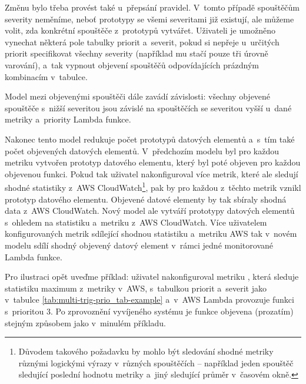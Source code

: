 \documentclass[czech, ing, kiv, he, iso690]{fasthesis}
\begin{document}
Změnu bylo třeba provést také u~přepsání pravidel. V~tomto případě spouštěčům severity neměníme, neboť prototypy se všemi severitami již existují, ale můžeme volit, zda konkrétní spouštěče z~prototypů vytvářet. Uživateli je umožněno vynechat některá pole tabulky priorit a~severit, pokud si nepřeje u~určitých priorit specifikovat všechny severity (například mu stačí pouze tři úrovně varování), a~tak vypnout objevení spouštěčů odpovídajících prázdným kombinacím v~tabulce.

Model mezi objevenými spouštěči dále zavádí závislosti: všechny objevené spouštěče s~nižší severitou jsou závislé na spouštěčích se severitou vyšší u~dané metriky a~priority Lambda funkce.

Nakonec tento model redukuje počet prototypů datových elementů a~s~tím také počet objevených datových elementů. V~předchozím modelu byl pro každou metriku vytvořen prototyp datového elementu, který byl poté objeven pro každou objevenou funkci. Pokud tak uživatel nakonfiguroval více metrik, které ale sledují shodné statistiky z~AWS CloudWatch\footnote{Důvodem takového požadavku by mohlo být sledování shodné metriky různými logickými výrazy v~různých spouštěčích -- například jeden spouštěč sledující poslední hodnotu metriky a~jiný sledující průměr v~časovém okně.}, pak by pro každou z~těchto metrik vznikl prototyp datového elementu. Objevené datové elementy by tak sbíraly shodná data z~AWS CloudWatch. Nový model ale vytváří prototypy datových elementů s~ohledem na statistiku a~metriku z~AWS CloudWatch. Více uživatelem konfigurovaných metrik sdílející shodnou statistiku a~metriku AWS tak v~novém modelu sdílí shodný objevený datový element v~rámci jedné monitorované Lambda funkce.

Pro ilustraci opět uveďme příklad: uživatel nakonfiguroval metriku , která sleduje statistiku maximum z~metriky  v~AWS, s~tabulkou priorit a~severit jako v~tabulce \ref{tab:multi-trig-prio_tab-example} a~v~AWS Lambda provozuje funkci  s~prioritou 3. Po zprovoznění vyvíjeného systému je funkce objevena (prozatím) stejným způsobem jako v~minulém příkladu. 
\end{document}
